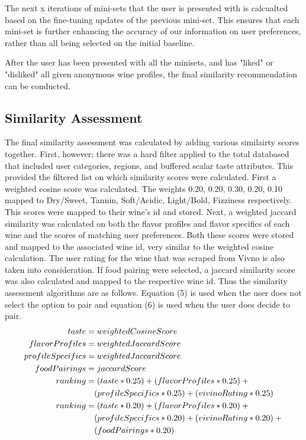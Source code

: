 \documentclass{article} %
\begin{document}
The next x iterations of mini-sets that the user is presented with is calcualted based on the fine-tuning updates of the previous mini-set. This ensures that each mini-set is further enhancing the accuracy of our information on user preferences, rather than all being selected on the initial baseline.

After the user has been presented with all the minisets, and has "liked" or "disliked" all given anonymous wine profiles, the final similarity recommendation can be conducted. 

\subsection{Similarity Assessment}
The final similarity assessment was calculated by adding various similairty scores together. First, however; there was a hard filter applied to the total databased that included user categories, regions, and buffered scalar taste attributes. This provided the filtered list on which  similarity scores were calculated. First a weighted cosine score was calculated. The weights 0.20, 0.20, 0.30, 0.20, 0.10 mapped to Dry/Sweet, Tannin, Soft/Acidic, Light/Bold, Fizziness respectively. This scores were mapped to their wine's id and stored. Next, a weighted jaccard similarity was calculated on both the flavor profiles and flavor specifics of each wine and the scores of matching user preferences. Both these scores were stored and mapped to the associated wine id, very similar to the weighted cosine calculation. The user rating for the wine that was scraped from Vivno is also taken into consideration. If food pairing were selected, a jaccard similarity score was also calculated and mapped to the respective wine id. Thus the similarity assessment algorithms are as follows. Equation (5) is used when the user does not select the option to pair and equation (6) is used when the user does decide to pair.
\begin{align}
taste &= weightedCosineScore \\
flavorProfiles &= weightedJaccardScore \\
profileSpecifics &= weightedJaccardScore \\
foodPairings &= jaccardScore \\
ranking &= (taste * 0.25) + (flavorProfiles * 0.25) + {} \notag \\
         &\quad (profileSpecifics * 0.25) + (vivinoRating * 0.25) \\
ranking &= (taste * 0.20) + (flavorProfiles * 0.20) + {} \notag \\
         &\quad (profileSpecifics * 0.20) + (vivinoRating * 0.20) + {} \notag \\
         &\quad (foodPairings * 0.20)
\end{align}
\end{document}
